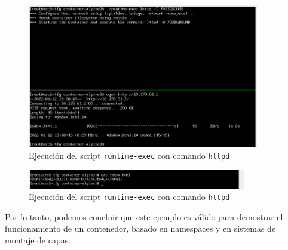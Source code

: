\documentclass[a4paper, oneside, 12pt]{book}
\begin{document}
\begin{enumerate}
		\pagebreak
		
		\begin{figure}[h!]
			\begin{center}
				\includegraphics[width=0.9\textwidth]{img/container_runtime3.png}
				\caption{Ejecución del script \texttt{runtime-exec} con comando \texttt{httpd}}
			\end{center}
		\end{figure}
	
		\begin{figure}[h!]
			\begin{center}
				\includegraphics[width=0.85\textwidth]{img/container_runtime4.png}
				\caption{Ejecución del script \texttt{runtime-exec} con comando \texttt{httpd}}
			\end{center}
		\end{figure}
		
		\noindent Por lo tanto, podemos concluir que este ejemplo es válido para demostrar el funcionamiento de un contenedor, basado en namespaces y en sistemas de montaje de capas.
		
	\end{enumerate}
	
	\pagebreak
	
\end{document}
